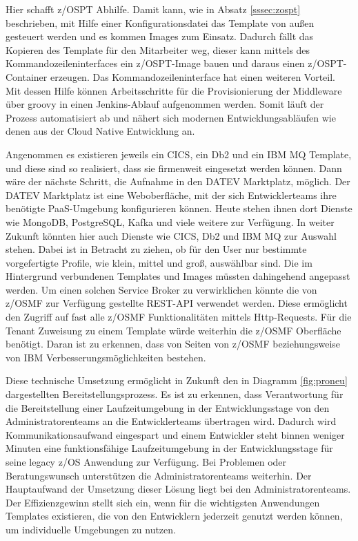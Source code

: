 Hier schafft z/OSPT Abhilfe.
Damit kann, wie in Absatz \ref{sssec:zospt} beschrieben, mit Hilfe einer Konfigurationsdatei das Template von außen gesteuert werden und es kommen Images zum Einsatz.
Dadurch fällt das Kopieren des Template für den Mitarbeiter weg, dieser kann mittels des Kommandozeileninterfaces ein z/OSPT-Image bauen und daraus einen z/OSPT-Container erzeugen.
Das Kommandozeileninterface hat einen weiteren Vorteil.
Mit dessen Hilfe können Arbeitsschritte für die Provisionierung der Middleware über groovy in einen Jenkins-Ablauf aufgenommen werden.
Somit läuft der Prozess automatisiert ab und nähert sich modernen Entwicklungsabläufen wie denen aus der Cloud Native Entwicklung an.

Angenommen es existieren jeweils ein CICS, ein Db2 und ein IBM MQ Template, und diese sind so realisiert, dass sie firmenweit eingesetzt werden können.
Dann wäre der nächste Schritt, die Aufnahme in den \glqq DATEV Marktplatz\grqq, möglich.
Der \glqq DATEV Marktplatz\grqq{} ist eine Weboberfläche, mit der sich Entwicklerteams ihre benötigte PaaS-Umgebung konfigurieren können.
Heute stehen ihnen dort Dienste wie MongoDB, PostgreSQL, Kafka und viele weitere zur Verfügung.
In weiter Zukunft könnten hier auch Dienste wie CICS, Db2 und IBM MQ zur Auswahl stehen.
Dabei ist in Betracht zu ziehen, ob für den User nur bestimmte vorgefertigte Profile, wie \glqq klein\grqq, \glqq mittel\grqq{} und \glqq groß\grqq, auswählbar sind.
Die im Hintergrund verbundenen Templates und Images müssten dahingehend angepasst werden.
Um einen solchen \glqq Service Broker\grqq{} zu verwirklichen könnte die von z/OSMF zur Verfügung gestellte REST-API verwendet werden.
Diese ermöglicht den Zugriff auf fast alle z/OSMF Funktionalitäten mittels Http-Requests.
Für die \glqq Tenant\grqq{} Zuweisung zu einem Template würde weiterhin die z/OSMF Oberfläche benötigt.
Daran ist zu erkennen, dass von Seiten von z/OSMF beziehungsweise von IBM Verbesserungsmöglichkeiten bestehen.

Diese technische Umsetzung ermöglicht in Zukunft den in Diagramm \ref{fig:proneu} dargestellten Bereitstellungsprozess.
Es ist zu erkennen, dass Verantwortung für die Bereitstellung einer Laufzeitumgebung in der Entwicklungsstage von den Administratorenteams an die Entwicklerteams übertragen wird.
Dadurch wird Kommunikationsaufwand eingespart und einem Entwickler steht binnen weniger Minuten eine funktionsfähige Laufzeitumgebung in der Entwicklungsstage für seine legacy z/OS Anwendung zur Verfügung.
Bei Problemen oder Beratungswunsch unterstützen die Administratorenteams weiterhin.
Der Hauptaufwand der Umsetzung dieser Lösung liegt bei den Administratorenteams.
Der Effizienzgewinn stellt sich ein, wenn für die wichtigsten Anwendungen Templates existieren, die von den Entwicklern jederzeit genutzt werden können, um individuelle Umgebungen zu nutzen.

